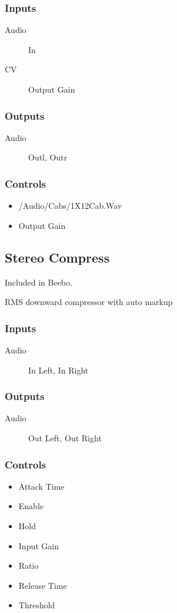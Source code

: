 \subsubsection{Inputs}
\begin{description}
\item [Audio] In
\item [CV] Output Gain
\end{description}

\subsubsection{Outputs}
\begin{description}
\item [Audio] Outl, Outr
\end{description}

\subsubsection{Controls}
\begin{itemize}
\item /Audio/Cabs/1X12Cab.Wav
\item Output Gain
\end{itemize}

\subsection{Stereo Compress}

Included in Beebo.

RMS downward compressor with auto markup



\subsubsection{Inputs}
\begin{description}
\item [Audio] In Left, In Right
\end{description}

\subsubsection{Outputs}
\begin{description}
\item [Audio] Out Left, Out Right
\end{description}

\subsubsection{Controls}
\begin{itemize}
\item Attack Time
\item Enable
\item Hold
\item Input Gain
\item Ratio
\item Release Time
\item Threshold
\end{itemize}

